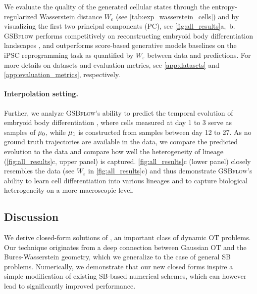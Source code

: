  We evaluate the quality of the generated cellular states through the entropy-regularized Wasserstein distance $W_\varepsilon$
(see \cref{tab:exp_wasserstein_cells}) and by visualizing the first two principal components (PC), see \cref{fig:all_results}a,~b.
\textsc{GSBflow} performs competitively on reconstructing embryoid body differentiation landscapes \citep{moon2019visualizing}, and outperforms score-based generative models baselines on the \acrfull{iPSC} reprogramming task \citep{schiebinger2019optimal} as quantified by $W_\varepsilon$ between data and predictions.
For more details on datasets and evaluation metrics, see \cref{app:datasets} and \cref{app:evaluation_metrics}, respectively.

\paragraph{Interpolation setting.}
Further, we analyze \textsc{GSBflow}'s ability to predict the temporal evolution of embryoid body differentiation \citep{moon2019visualizing}, where cells measured at day 1 to 3 serve as samples of $\mu_0$, while $\mu_1$ is constructed from samples between day 12 to 27. As no ground truth trajectories are available in the data, we compare the predicted evolution to the data and compare how well the heterogeneity of lineage (\cref{fig:all_results}c, upper panel) is captured.
\cref{fig:all_results}c (lower panel) closely resembles the data (see $W_\varepsilon$ in \cref{fig:all_results}c) and thus demonstrate \textsc{GSBflow}'s ability to learn cell differentiation into various lineages and to capture biological heterogeneity on a more macroscopic level.

\subsection{Discussion}
 We derive closed-form solutions of , an important class of dynamic \acrshort{OT} problems. Our technique originates from a deep connection between Gaussian \acrshort{OT} and the Bures-Wasserstein geometry, which we generalize to the case of general \acrshort{SB} problems. Numerically, we demonstrate that our new closed forms inspire a simple modification of existing \acrshort{SB}-based numerical schemes, which can however lead to significantly improved performance.

